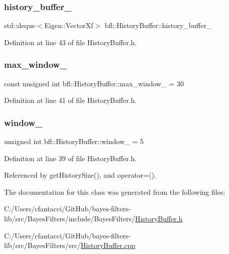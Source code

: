 \subsubsection{\texorpdfstring{history\+\_\+buffer\+\_\+}{history\_buffer\_}}
{\footnotesize\ttfamily std\+::deque$<$Eigen\+::\+Vector\+Xf$>$ bfl\+::\+History\+Buffer\+::history\+\_\+buffer\+\_\+\hspace{0.3cm}{\ttfamily [private]}}



Definition at line 43 of file History\+Buffer.\+h.

\mbox{\label{classbfl_1_1HistoryBuffer_aeb4d2b9c58f06177b0daaf640e2b6c9e}} 
\subsubsection{\texorpdfstring{max\+\_\+window\+\_\+}{max\_window\_}}
{\footnotesize\ttfamily const unsigned int bfl\+::\+History\+Buffer\+::max\+\_\+window\+\_\+ = 30\hspace{0.3cm}{\ttfamily [private]}}



Definition at line 41 of file History\+Buffer.\+h.

\mbox{\label{classbfl_1_1HistoryBuffer_a135dd1829747ba2f414f12fd8282f75a}} 
\subsubsection{\texorpdfstring{window\+\_\+}{window\_}}
{\footnotesize\ttfamily unsigned int bfl\+::\+History\+Buffer\+::window\+\_\+ = 5\hspace{0.3cm}{\ttfamily [private]}}



Definition at line 39 of file History\+Buffer.\+h.



Referenced by get\+History\+Size(), and operator=().



The documentation for this class was generated from the following files\+:\begin{DoxyCompactItemize}
\item 
C\+:/\+Users/cfantacci/\+Git\+Hub/bayes-\/filters-\/lib/src/\+Bayes\+Filters/include/\+Bayes\+Filters/\mbox{\hyperlink{HistoryBuffer_8h}{History\+Buffer.\+h}}\item 
C\+:/\+Users/cfantacci/\+Git\+Hub/bayes-\/filters-\/lib/src/\+Bayes\+Filters/src/\mbox{\hyperlink{HistoryBuffer_8cpp}{History\+Buffer.\+cpp}}\end{DoxyCompactItemize}
